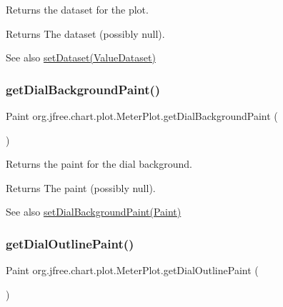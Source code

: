 Returns the dataset for the plot.

\begin{DoxyReturn}{Returns}
The dataset (possibly {\ttfamily null}).
\end{DoxyReturn}
\begin{DoxySeeAlso}{See also}
\mbox{\hyperlink{classorg_1_1jfree_1_1chart_1_1plot_1_1_meter_plot_aba3154ee89861d9e3ca9b0fd7239b829}{set\+Dataset(\+Value\+Dataset)}} 
\end{DoxySeeAlso}
\mbox{\label{classorg_1_1jfree_1_1chart_1_1plot_1_1_meter_plot_aa28a88c359b9a441fdcc8d4f1f0a5ecf}} 
\subsubsection{\texorpdfstring{get\+Dial\+Background\+Paint()}{getDialBackgroundPaint()}}
{\footnotesize\ttfamily Paint org.\+jfree.\+chart.\+plot.\+Meter\+Plot.\+get\+Dial\+Background\+Paint (\begin{DoxyParamCaption}{ }\end{DoxyParamCaption})}

Returns the paint for the dial background.

\begin{DoxyReturn}{Returns}
The paint (possibly {\ttfamily null}).
\end{DoxyReturn}
\begin{DoxySeeAlso}{See also}
\mbox{\hyperlink{classorg_1_1jfree_1_1chart_1_1plot_1_1_meter_plot_aecab997e41adbba2f37c6da45a1745f0}{set\+Dial\+Background\+Paint(\+Paint)}} 
\end{DoxySeeAlso}
\mbox{\label{classorg_1_1jfree_1_1chart_1_1plot_1_1_meter_plot_a5b42cb9e31e25b2acd71c44dbc420388}} 
\subsubsection{\texorpdfstring{get\+Dial\+Outline\+Paint()}{getDialOutlinePaint()}}
{\footnotesize\ttfamily Paint org.\+jfree.\+chart.\+plot.\+Meter\+Plot.\+get\+Dial\+Outline\+Paint (\begin{DoxyParamCaption}{ }\end{DoxyParamCaption})}

